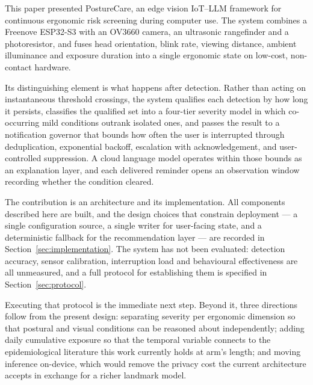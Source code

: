 This paper presented PostureCare, an edge vision IoT--LLM framework for continuous ergonomic risk
screening during computer use. The system combines a Freenove ESP32-S3 with an OV3660 camera, an
ultrasonic rangefinder and a photoresistor, and fuses head orientation, blink rate, viewing
distance, ambient illuminance and exposure duration into a single ergonomic state on low-cost,
non-contact hardware.

Its distinguishing element is what happens after detection. Rather than acting on instantaneous
threshold crossings, the system qualifies each detection by how long it persists, classifies the
qualified set into a four-tier severity model in which co-occurring mild conditions outrank isolated
ones, and passes the result to a notification governor that bounds how often the user is interrupted
through deduplication, exponential backoff, escalation with acknowledgement, and user-controlled
suppression. A cloud language model operates within those bounds as an explanation layer, and each
delivered reminder opens an observation window recording whether the condition cleared.

The contribution is an architecture and its implementation. All components described here are
built, and the design choices that constrain deployment --- a single configuration source, a single
writer for user-facing state, and a deterministic fallback for the recommendation layer --- are
recorded in Section~\ref{sec:implementation}. The system has not been evaluated: detection
accuracy, sensor calibration, interruption load and behavioural effectiveness are all unmeasured,
and a full protocol for establishing them is specified in Section~\ref{sec:protocol}.

Executing that protocol is the immediate next step. Beyond it, three directions follow from the
present design: separating severity per ergonomic dimension so that postural and visual conditions
can be reasoned about independently; adding daily cumulative exposure so that the temporal variable
connects to the epidemiological literature this work currently holds at arm's length; and moving
inference on-device, which would remove the privacy cost the current architecture accepts in
exchange for a richer landmark model.
